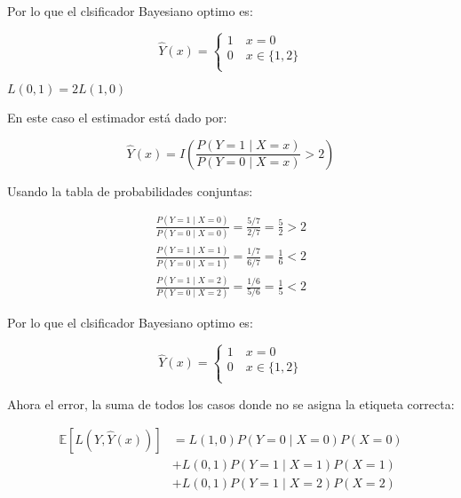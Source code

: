 \documentclass[letter, 11pt, twoside]{report}
\begin{document}
    Por lo que el clsificador Bayesiano optimo es:

    \begin{equation}
        \hat{Y}(x) =
             \begin{cases}
             1 \quad x=0\\
             0 \quad x\in\{1,2\}\\
             \end{cases}
     \end{equation}

    
     
    {\color{mirosa} $L(0,1)=2L(1,0)$}


    En este caso el estimador está dado por:

    \begin{equation}
        \widehat{Y}(x)=I\left(\frac{P(Y=1 \mid X=x)}{P(Y=0 \mid X=x)}>2\right) 
    \end{equation}

    Usando la tabla de probabilidades conjuntas:
    
    $$
    \begin{gathered}
    \frac{P(Y=1 \mid X=0)}{P(Y=0 \mid X=0)}=\frac{5 / 7}{2 / 7}=\frac{5}{2}>2\\
    \frac{P(Y=1 \mid X=1)}{P(Y=0 \mid X=1)}=\frac{1 / 7}{6 / 7}=\frac{1}{6}<2\\
    \frac{P(Y=1 \mid X=2)}{P(Y=0 \mid X=2)}=\frac{1 / 6}{5 / 6}=\frac{1}{5}<2
    \end{gathered}
    $$

    Por lo que el clsificador Bayesiano optimo es:

    \begin{equation}
        \hat{Y}(x) =
             \begin{cases}
             1 \quad x=0\\
             0 \quad x\in\{1,2\}\\
             \end{cases}
     \end{equation}



    


    
     Ahora el error, la suma de todos los casos donde no se asigna la etiqueta correcta:


\begin{equation*}
\begin{split}
    \mathbb{E}[L(Y, \widehat{Y}(x))] & =L(1,0) P(Y=0 \mid X=0) P(X=0) \\
    &+L(0,1) P(Y=1 \mid X=1) P(X=1)\\
    &+L(0,1) P(Y=1 \mid X=2) P(X=2) \\
\end{split}
\end{equation*}
\end{document}
